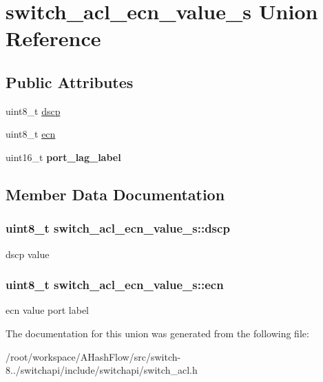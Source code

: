 \hypertarget{unionswitch__acl__ecn__value__s}{\section{switch\+\_\+acl\+\_\+ecn\+\_\+value\+\_\+s Union Reference}
\label{unionswitch__acl__ecn__value__s}
}
\subsection*{Public Attributes}
\begin{DoxyCompactItemize}
\item 
uint8\+\_\+t \hyperlink{unionswitch__acl__ecn__value__s_ae1325cab7a86c8e2b6704fa4f591da3c}{dscp}
\item 
uint8\+\_\+t \hyperlink{unionswitch__acl__ecn__value__s_a3c2fe7aba327ebdb234a831cd388be7a}{ecn}
\item 
\hypertarget{unionswitch__acl__ecn__value__s_afd8c622e332d9e3e354fa3e1d4c40ba9}{uint16\+\_\+t {\bfseries port\+\_\+lag\+\_\+label}}\label{unionswitch__acl__ecn__value__s_afd8c622e332d9e3e354fa3e1d4c40ba9}

\end{DoxyCompactItemize}


\subsection{Member Data Documentation}
\hypertarget{unionswitch__acl__ecn__value__s_ae1325cab7a86c8e2b6704fa4f591da3c}{
\subsubsection[{dscp}]{\setlength{\rightskip}{0pt plus 5cm}uint8\+\_\+t switch\+\_\+acl\+\_\+ecn\+\_\+value\+\_\+s\+::dscp}}\label{unionswitch__acl__ecn__value__s_ae1325cab7a86c8e2b6704fa4f591da3c}
dscp value \hypertarget{unionswitch__acl__ecn__value__s_a3c2fe7aba327ebdb234a831cd388be7a}{
\subsubsection[{ecn}]{\setlength{\rightskip}{0pt plus 5cm}uint8\+\_\+t switch\+\_\+acl\+\_\+ecn\+\_\+value\+\_\+s\+::ecn}}\label{unionswitch__acl__ecn__value__s_a3c2fe7aba327ebdb234a831cd388be7a}
ecn value port label 

The documentation for this union was generated from the following file\+:\begin{DoxyCompactItemize}
\item 
/root/workspace/\+A\+Hash\+Flow/src/switch-\/8../switchapi/include/switchapi/switch\+\_\+acl.\+h\end{DoxyCompactItemize}
